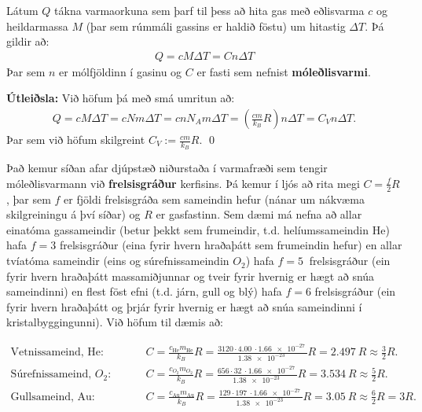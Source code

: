 \begin{tcolorbox}
\begin{theorem}
Látum $Q$ tákna varmaorkuna sem þarf til þess að hita gas með eðlisvarma $c$ og heildarmassa $M$ (þar sem rúmmáli gassins er haldið föstu) um hitastig $\Delta T$. Þá gildir að:
\begin{align*}
    Q = cM\Delta T = Cn\Delta T
\end{align*}
Þar sem $n$ er mólfjöldinn í gasinu og $C$ er fasti sem nefnist \textbf{móleðlisvarmi}.
\end{theorem}
\end{tcolorbox}

\textbf{Útleiðsla:} Við höfum þá með smá umritun að:
\begin{align*}
    Q = cM\Delta T = cNm \Delta T = cn N_A m \Delta T = \left( \frac{c m}{k_B}R \right) n \Delta T = C_V n \Delta T.
\end{align*}
Þar sem við höfum skilgreint $C_V := \frac{cm}{k_B}R$. \qed

\vspace{0.2cm}

Það kemur síðan afar djúpstæð niðurstaða í varmafræði sem tengir móleðlisvarmann við \textbf{frelsisgráður} kerfisins. Þá kemur í ljós að rita megi $C = \frac{f}{2}R$, þar sem $f$ er fjöldi frelsisgráða sem sameindin hefur (nánar um nákvæma skilgreiningu á því síðar) og $R$ er gasfastinn. Sem dæmi má nefna að allar einatóma gassameindir (betur þekkt sem frumeindir, t.d. helíumssameindin $\text{He}$) hafa $f = 3$ frelsisgráður (eina fyrir hvern hraðaþátt sem frumeindin hefur) en allar tvíatóma sameindir (eins og súrefnissameindin $O_2$) hafa $f = \SI{5}{}$ frelsisgráður (ein fyrir hvern hraðaþátt massamiðjunnar og tveir fyrir hvernig er hægt að snúa sameindinni) en flest föst efni (t.d. járn, gull og blý) hafa $f = 6$ frelsisgráður (ein fyrir hvern hraðaþátt og þrjár fyrir hvernig er hægt að snúa sameindinni í kristalbyggingunni). Við höfum til dæmis að:

\begin{align*}
    \text{Vetnissameind, $\text{He}$:}& \hspace{1cm} C = \frac{c_{\text{He}}m_{\text{He}}}{k_B} R = \frac{3120 \cdot \SI{4,00}{} \cdot \SI{1.66e-27}{}}{\SI{1.38e-23}{}} R = \SI{2.497}{}R \approx \frac{3}{2}R. \\
    \text{Súrefnissameind, $O_2$:}& \hspace{1cm} C = \frac{c_{\text{$O_2$}}m_{\text{$O_2$}}}{k_B} R = \frac{656 \cdot \SI{32}{} \cdot \SI{1.66e-27}{}}{\SI{1.38e-23}{}} R = \SI{3.534}{}R \approx \frac{5}{2}R. \\
    \text{Gullsameind, $\text{Au}$:}& \hspace{1cm} C = \frac{c_{\text{Au}}m_{\text{Au}}}{k_B} R = \frac{129 \cdot \SI{197}{} \cdot \SI{1.66e-27}{}}{\SI{1.38e-23}{}} R = \SI{3.05}{}R \approx \frac{6}{2}R = 3R.
\end{align*}

